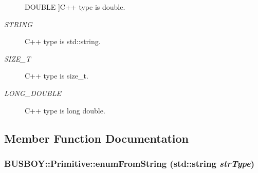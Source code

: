 \begin{Desc}
\begin{description}
{\hypertarget{classBUSBOY_1_1Primitive_afa08dc3cc68d2e851adafb0fc492cf15aaeb20f54c2339d133fee10fabe184a2f}{
DOUBLE}
\label{classBUSBOY_1_1Primitive_afa08dc3cc68d2e851adafb0fc492cf15aaeb20f54c2339d133fee10fabe184a2f}
}]C++ type is double. \item[{\em 
\hypertarget{classBUSBOY_1_1Primitive_afa08dc3cc68d2e851adafb0fc492cf15a087bfa8a3ba96f804a5f588e1ceb7a69}{
STRING}
\label{classBUSBOY_1_1Primitive_afa08dc3cc68d2e851adafb0fc492cf15a087bfa8a3ba96f804a5f588e1ceb7a69}
}]C++ type is std::string. \item[{\em 
\hypertarget{classBUSBOY_1_1Primitive_afa08dc3cc68d2e851adafb0fc492cf15a2f7ce3fa59551e321daa60bf2b5f74bc}{
SIZE\_\-T}
\label{classBUSBOY_1_1Primitive_afa08dc3cc68d2e851adafb0fc492cf15a2f7ce3fa59551e321daa60bf2b5f74bc}
}]C++ type is size\_\-t. \item[{\em 
\hypertarget{classBUSBOY_1_1Primitive_afa08dc3cc68d2e851adafb0fc492cf15a619ade1bb4d6f4459a7df93c577607dd}{
LONG\_\-DOUBLE}
\label{classBUSBOY_1_1Primitive_afa08dc3cc68d2e851adafb0fc492cf15a619ade1bb4d6f4459a7df93c577607dd}
}]C++ type is long double. \end{description}
\end{Desc}



\subsection{Member Function Documentation}
\hypertarget{classBUSBOY_1_1Primitive_a38158d1a2452165a27c6cb2279cb0624}{
\subsubsection[{enumFromString}]{ BUSBOY::Primitive::enumFromString (std::string {\em strType})}}
\label{classBUSBOY_1_1Primitive_a38158d1a2452165a27c6cb2279cb0624}


